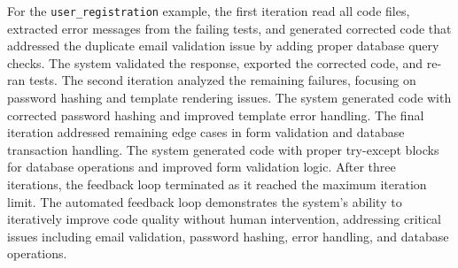 For the \texttt{user\_registration} example, the first iteration read all code files, extracted error messages from the failing tests, and generated corrected code that addressed the duplicate email validation issue by adding proper database query checks. The system validated the response, exported the corrected code, and re-ran tests. The second iteration analyzed the remaining failures, focusing on password hashing and template rendering issues. The system generated code with corrected password hashing and improved template error handling. The final iteration addressed remaining edge cases in form validation and database transaction handling. The system generated code with proper try-except blocks for database operations and improved form validation logic. After three iterations, the feedback loop terminated as it reached the maximum iteration limit. The automated feedback loop demonstrates the system's ability to iteratively improve code quality without human intervention, addressing critical issues including email validation, password hashing, error handling, and database operations.
